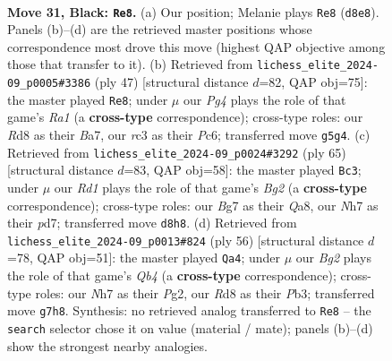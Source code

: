 \documentclass[11pt]{article}
\begin{document}
\clearpage

\begin{figure}[p]\centering
\begin{subfigure}{0.46\textwidth}\centering
\resizebox{\linewidth}{!}{%
\newchessgame
\chessboard[
  setfen={3r4/kp2p1bn/1r1pQ3/1b4p1/3PP3/1PR2P2/6PP/1K1R4 b - - 7 31},
  showmover=false,
  pgfstyle=straightmove, color=movearrow, markmove={d8-e8}
]}
\caption{}
\end{subfigure}\hfill
\begin{subfigure}{0.46\textwidth}\centering
\resizebox{\linewidth}{!}{%
\newchessgame
\chessboard[
  setfen={r6k/bp3r1p/p1p2p1Q/8/P5b1/2PB4/1P4PP/R6K b - - 0 24},
  showmover=false,
  pgfstyle=straightmove, color=movearrow, markmove={a8-e8}
]}
\caption{}
\end{subfigure}
\\[4pt]
\begin{subfigure}{0.46\textwidth}\centering
\resizebox{\linewidth}{!}{%
\newchessgame
\chessboard[
  setfen={qr4k1/3Pp1bp/4P1p1/8/p7/5N1P/Qp3PP1/3R2K1 b - - 3 33},
  showmover=false,
  pgfstyle=straightmove, color=movearrow, markmove={g7-c3}
]}
\caption{}
\end{subfigure}\hfill
\begin{subfigure}{0.46\textwidth}\centering
\resizebox{\linewidth}{!}{%
\newchessgame
\chessboard[
  setfen={4r1k1/ppr2p1p/6p1/8/1QP2q2/1P5P/P4PP1/1B3RK1 w - - 5 29},
  showmover=false,
  pgfstyle=straightmove, color=movearrow, markmove={b4-a4}
]}
\caption{}
\end{subfigure}
\caption{\textbf{Move 31, Black: \texttt{Re8}.} (a) Our position; Melanie plays \texttt{Re8} (\texttt{d8e8}). Panels (b)--(d) are the retrieved master positions whose correspondence most drove this move (highest QAP objective among those that transfer to it). (b) Retrieved from \texttt{lichess\_elite\_2024-09\_p0005\#3386} (ply 47) [structural distance $d$=82, QAP obj=75]: the master played \texttt{Re8}; under $\mu$ our \emph{Pg4} plays the role of that game's \emph{Ra1} (a \textbf{cross-type} correspondence); cross-type roles: our \emph{R}d8 as their \emph{B}a7, our \emph{r}c3 as their \emph{P}c6; transferred move \texttt{g5g4}. (c) Retrieved from \texttt{lichess\_elite\_2024-09\_p0024\#3292} (ply 65) [structural distance $d$=83, QAP obj=58]: the master played \texttt{Bc3}; under $\mu$ our \emph{Rd1} plays the role of that game's \emph{Bg2} (a \textbf{cross-type} correspondence); cross-type roles: our \emph{B}g7 as their \emph{Q}a8, our \emph{N}h7 as their \emph{p}d7; transferred move \texttt{d8h8}. (d) Retrieved from \texttt{lichess\_elite\_2024-09\_p0013\#824} (ply 56) [structural distance $d$=78, QAP obj=51]: the master played \texttt{Qa4}; under $\mu$ our \emph{Bg2} plays the role of that game's \emph{Qb4} (a \textbf{cross-type} correspondence); cross-type roles: our \emph{N}h7 as their \emph{P}g2, our \emph{R}d8 as their \emph{P}b3; transferred move \texttt{g7h8}. Synthesis: no retrieved analog transferred to \texttt{Re8} -- the \texttt{search} selector chose it on value (material / mate); panels (b)--(d) show the strongest nearby analogies.}
\label{fig:thought-m61}
\end{figure}
\end{document}
